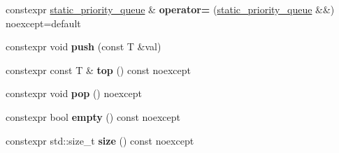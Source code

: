 \begin{DoxyCompactItemize}
\item 
\mbox{\label{classsequoia_1_1data__structures_1_1static__priority__queue_a8152092b4b94b3cb959ae8139a104d3b}} 
constexpr \mbox{\hyperlink{classsequoia_1_1data__structures_1_1static__priority__queue}{static\+\_\+priority\+\_\+queue}} \& {\bfseries operator=} (\mbox{\hyperlink{classsequoia_1_1data__structures_1_1static__priority__queue}{static\+\_\+priority\+\_\+queue}} \&\&) noexcept=default
\item 
\mbox{\label{classsequoia_1_1data__structures_1_1static__priority__queue_a5ee94275d73f31d9510384ac10faf115}} 
constexpr void {\bfseries push} (const T \&val)
\item 
\mbox{\label{classsequoia_1_1data__structures_1_1static__priority__queue_a686ccc0b9c316af19815a3f775c15141}} 
constexpr const T \& {\bfseries top} () const noexcept
\item 
\mbox{\label{classsequoia_1_1data__structures_1_1static__priority__queue_a7c7a6871d147bf14b6d0034e17df1fee}} 
constexpr void {\bfseries pop} () noexcept
\item 
\mbox{\label{classsequoia_1_1data__structures_1_1static__priority__queue_a795cb96a77345cf04e61232b1ed3d849}} 
constexpr bool {\bfseries empty} () const noexcept
\item 
\mbox{\label{classsequoia_1_1data__structures_1_1static__priority__queue_a3db968ff2783596a0cdecccb996e0d83}} 
constexpr std\+::size\+\_\+t {\bfseries size} () const noexcept
\end{DoxyCompactItemize}

